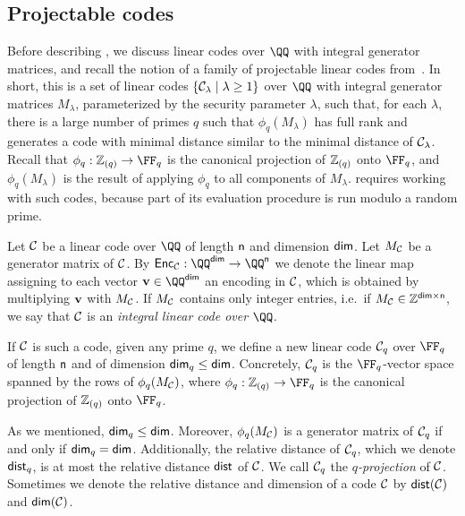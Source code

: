 \documentclass[11pt,letterpaper,usenames,dvipsnames]{article}
\begin{document}
\subsection{Projectable codes}
\label{sec:projectable-codes}

Before describing \zipp, we discuss linear codes over $\QQ$ with integral generator matrices, and recall the notion of a family of projectable linear codes from~\cite{EPRINT:GWHD25}. In short, this is a set of linear codes $\{{\mathcal{C}_{\lambda}}\mid \lambda \geq 1\}$ over $\QQ$ with integral generator matrices $M_\lambda$, parameterized by the security parameter $\lambda$, such that, for each $\lambda$, there is a large number of primes $q$ such that $\phi_q(M_\lambda)$ has full rank and generates a code with minimal distance similar to the minimal distance of ${\mathcal{C}_{\lambda}}$. Recall that $\phi_q:\local{q}\to \FF_q$ is the canonical projection of $\mathbb{Z}_{(q)}$ onto $\FF_q$, and $\phi_q(M_\lambda)$ is the result of applying $\phi_q$ to all components of $M_\lambda$. \zipp requires working with such codes, because part of its evaluation procedure is run modulo a random prime.

Let $\mathcal{C}$ be a linear code over $\QQ$ of length $\mathsf{n}$ and dimension $\mathsf{dim}$.  Let $M_{\mathcal{C}}$ be a generator matrix of $\mathcal{C}$. By $\Enc_{\codelinplain}: \QQ^\codedim \to \QQ^\codelength$ we denote the linear map assigning to each vector $\vv\in \QQ^\codedim$ an encoding in $\mathcal{C}$, which is obtained by multiplying $\mathbf{v}$ with $M_{\mathcal{C}}$. If $M_{\mathcal{C}}$ contains only integer entries, i.e.\ if $M_{\mathcal{C}}\in \mathbb{Z}^{\mathsf{dim}\times \mathsf{n}}$, we say that $\mathcal{C}$ is an \emph{integral linear code over $\QQ$.}

If $\mathcal{C}$ is such a code,  given any prime $q$, we define a new linear code $\mathcal{C}_q$ over $\FF_q$ of length $\mathsf{n}$ and of dimension $\mathsf{dim}_q\leq \mathsf{dim}$. Concretely, $\mathcal{C}_q$ is the $\FF_q$-vector space spanned by the rows of $\phi_q(M_{\mathcal{C}})$, where $\phi_q: \local{q} \to \FF_q$ is the canonical projection of $\mathbb{Z}_{(q)}$ onto $\FF_q$. 

As we mentioned, $\mathsf{dim}_q\leq \mathsf{dim}$. Moreover,  $\phi_q(M_{\mathcal{C}})$ is a generator matrix of $\mathcal{C}_q$ if and only if $\mathsf{dim}_q=\mathsf{dim}$. Additionally,  the relative distance of $\mathcal{C}_q$, which we denote $\mathsf{dist}_q$, is at most the relative distance $\mathsf{dist}$ of $\mathcal{C}$. We call $\mathcal{C}_q$ the \emph{$q$-projection} of $\mathcal{C}$. Sometimes we denote the relative distance and dimension of a code $\mathcal{C}$ by $\mathsf{dist}(\mathcal{C})$ and $\mathsf{dim}(\mathcal{C})$.
\end{document}
